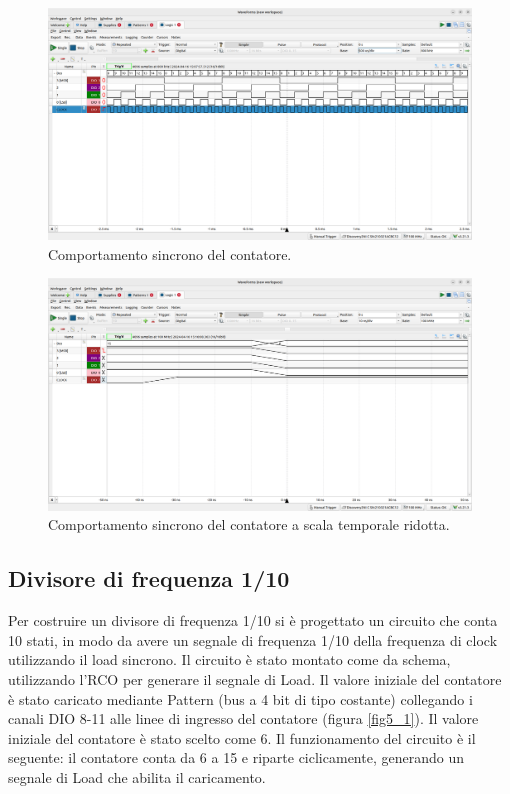 \documentclass[10pt,a4paper]{article}
\begin{document}
\begin{figure}[htp]
\begin{center}
\includegraphics[scale=0.25]{fig3.png}
\caption{Comportamento sincrono del contatore.}
\label{fig3}
\end{center}
\end{figure}

\begin{figure}[htp]
\begin{center}
\includegraphics[scale=0.25]{fig4.png}
\caption{Comportamento sincrono del contatore a scala temporale ridotta.}
\label{fig4}
\end{center}
\end{figure}

\subsection{Divisore di frequenza 1/10}
Per costruire un divisore di frequenza 1/10 si è progettato un circuito che conta 10 stati, in modo da avere un segnale di frequenza 1/10 della frequenza di clock utilizzando il load sincrono. Il circuito è stato montato come da schema, utilizzando l'RCO per generare il segnale di Load. Il valore iniziale del contatore è stato caricato mediante Pattern (bus a 4 bit di tipo costante) collegando i canali DIO 8-11 alle linee di ingresso del contatore (figura \ref{fig5_1}). Il valore iniziale del contatore è stato scelto come 6. Il funzionamento del circuito è il seguente: il contatore conta da 6 a 15 e riparte ciclicamente, generando un segnale di Load che abilita il caricamento.
\end{document}
